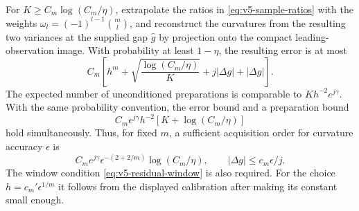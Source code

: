 \begin{theorem}\label{thm:v5-residual-recovery}
For $K\ge C_m\log(C_m/\eta)$, extrapolate the ratios in
\eqref{eq:v5-sample-ratios} with the weights
$\omega_l=(-1)^{l-1}\binom ml$, and reconstruct the curvatures from
the resulting two variances at the supplied gap $\widehat g$ by
projection onto the compact leading-observation image. With probability
at least $1-\eta$, the resulting error is at most
\begin{equation}\label{eq:v5-residual-error}
 C_m\left[h^m+\sqrt{\frac{\log(C_m/\eta)}K}
                  +j|\Delta g|+|\Delta g|\right].
\end{equation}
The expected number of unconditioned preparations is comparable to
$K h^{-2}e^{j\gamma}$. With the same probability convention, the
error bound and a preparation bound
\begin{equation}\label{eq:v5-residual-cost}
 C_m e^{j\gamma}h^{-2}[K+\log(C_m/\eta)]
\end{equation}
hold simultaneously. Thus, for fixed $m$, a sufficient acquisition
order for curvature accuracy $\epsilon$ is
\[
 C_m e^{j\gamma}\epsilon^{-(2+2/m)}\log(C_m/\eta),
 \qquad |\Delta g|\le c_m\epsilon/j.
\]
The window condition \eqref{eq:v5-residual-window} is also required.
For the choice $h=c_m'\epsilon^{1/m}$ it follows from the displayed
calibration after making its constant small enough.
\end{theorem}
